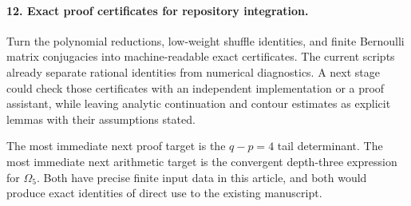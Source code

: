 \paragraph{12. Exact proof certificates for repository integration.}
Turn the polynomial reductions, low-weight shuffle identities, and
finite Bernoulli matrix conjugacies into machine-readable exact
certificates.  The current scripts already separate rational
identities from numerical diagnostics.  A next stage could check
those certificates with an independent implementation or a proof
assistant, while leaving analytic continuation and contour estimates
as explicit lemmas with their assumptions stated.

The most immediate next proof target is the $q-p=4$ tail determinant.
The most immediate next arithmetic target is the convergent
depth-three expression for $\Omega_5$.  Both have precise finite
input data in this article, and both would produce exact identities
of direct use to the existing manuscript.
